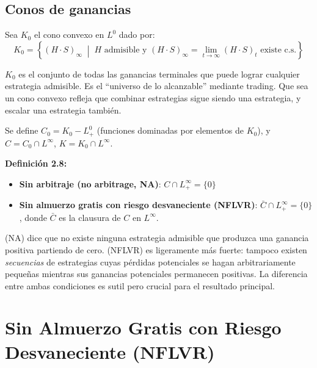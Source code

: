 \documentclass[12pt]{article}
\begin{document}
\subsection{Conos de ganancias}

Sea $K_0$ el cono convexo en $L^0$ dado por:
\begin{equation}
    K_0 = \left\{ (H \cdot S)_\infty \;\middle|\; H \text{ admisible y } (H \cdot S)_\infty = \lim_{t \to \infty} (H \cdot S)_t \text{ existe c.s.} \right\}
\end{equation}

\begin{intuicionmat}
$K_0$ es el conjunto de todas las ganancias terminales que puede lograr cualquier estrategia admisible. Es el ``universo de lo alcanzable'' mediante trading. Que sea un cono convexo refleja que combinar estrategias sigue siendo una estrategia, y escalar una estrategia tambi\'en.
\end{intuicionmat}

Se define $C_0 = K_0 - L^0_+$ (funciones dominadas por elementos de $K_0$), y $C = C_0 \cap L^\infty$, $K = K_0 \cap L^\infty$.

\textbf{Definici\'on 2.8:}
\begin{itemize}
    \item \textbf{Sin arbitraje (no arbitrage, NA)}: $C \cap L^\infty_+ = \{0\}$
    \item \textbf{Sin almuerzo gratis con riesgo desvaneciente (NFLVR)}: $\bar{C} \cap L^\infty_+ = \{0\}$, donde $\bar{C}$ es la clausura de $C$ en $L^\infty$.
\end{itemize}

\begin{intuicion}
(NA) dice que no existe ninguna estrategia admisible que produzca una ganancia positiva partiendo de cero. (NFLVR) es ligeramente m\'as fuerte: tampoco existen \emph{secuencias} de estrategias cuyas p\'erdidas potenciales se hagan arbitrariamente peque\~nas mientras sus ganancias potenciales permanecen positivas. La diferencia entre ambas condiciones es sutil pero crucial para el resultado principal.
\end{intuicion}

\section{Sin Almuerzo Gratis con Riesgo Desvaneciente (NFLVR)}
\end{document}
